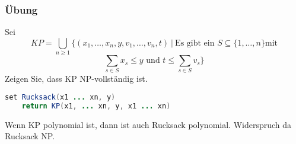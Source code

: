 \subsubsection{Übung}
Sei
\[KP = \bigcup_{n \geq 1} \{ (x_{1}, \dots, x_{n}, y, v_{1}, \dots, v_{n}, t) \:|\: \text{Es gibt ein } S \subseteq \{1, \ldots, n\} \text{mit}\]\[ \sum\limits_{s \in S} x_{s} \leq y \text{ und } t \leq \sum\limits_{s \in S} v_{s}\}\]
Zeigen Sie, dass KP NP-vollständig ist.

\begin{lstlisting}[language=java, caption={Beispiellösung Übung}]
set Rucksack(x1 ... xn, y)
	return KP(x1, ... xn, y, x1 ... xn)
\end{lstlisting}
Wenn KP polynomial ist, dann ist auch Rucksack polynomial. Widerspruch da Rucksack NP.